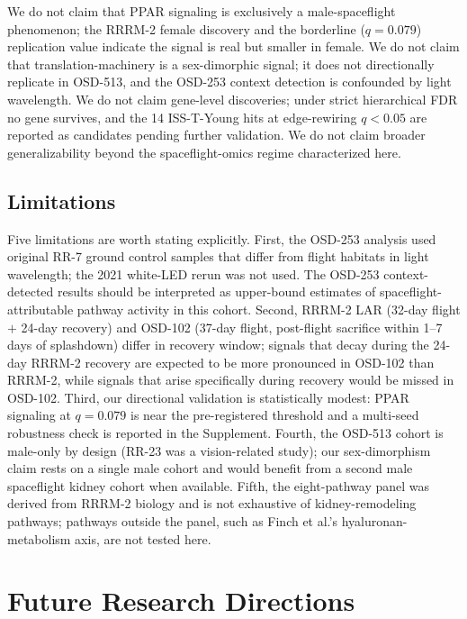 \documentclass[11pt]{article}
\begin{document}
We do not claim that PPAR signaling is exclusively a male-spaceflight phenomenon; the RRRM-2 female discovery and the borderline ($q = 0.079$) replication value indicate the signal is real but smaller in female. We do not claim that translation-machinery is a sex-dimorphic signal; it does not directionally replicate in OSD-513, and the OSD-253 context detection is confounded by light wavelength. We do not claim gene-level discoveries; under strict hierarchical FDR no gene survives, and the 14 ISS-T-Young hits at edge-rewiring $q < 0.05$ are reported as candidates pending further validation. We do not claim broader generalizability beyond the spaceflight-omics regime characterized here.

\subsection{Limitations}

Five limitations are worth stating explicitly. First, the OSD-253 analysis used original RR-7 ground control samples that differ from flight habitats in light wavelength; the 2021 white-LED rerun was not used. The OSD-253 context-detected results should be interpreted as upper-bound estimates of spaceflight-attributable pathway activity in this cohort. Second, RRRM-2 LAR (32-day flight $+$ 24-day recovery) and OSD-102 (37-day flight, post-flight sacrifice within 1--7 days of splashdown) differ in recovery window; signals that decay during the 24-day RRRM-2 recovery are expected to be more pronounced in OSD-102 than RRRM-2, while signals that arise specifically during recovery would be missed in OSD-102. Third, our directional validation is statistically modest: PPAR signaling at $q = 0.079$ is near the pre-registered threshold and a multi-seed robustness check is reported in the Supplement. Fourth, the OSD-513 cohort is male-only by design (RR-23 was a vision-related study); our sex-dimorphism claim rests on a single male cohort and would benefit from a second male spaceflight kidney cohort when available. Fifth, the eight-pathway panel was derived from RRRM-2 biology and is not exhaustive of kidney-remodeling pathways; pathways outside the panel, such as Finch et al.'s hyaluronan-metabolism axis, are not tested here.

\section{Future Research Directions}
\end{document}

